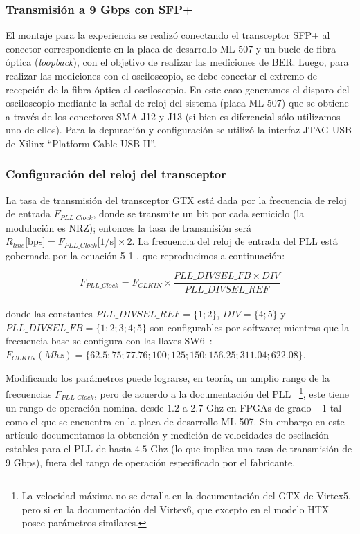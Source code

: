 \documentclass[12pt,twoside,openright]{moddalthesis}
\begin{document}
\subsubsection{Transmisión a 9 Gbps con SFP+}
El montaje para la experiencia se realizó conectando el transceptor SFP+
al conector correspondiente en la placa de desarrollo ML-507 y un bucle de
fibra óptica ({\em loopback}), con el objetivo de realizar las
mediciones de BER. Luego, para realizar las mediciones con el
osciloscopio, se debe conectar el extremo de recepción de la fibra
óptica al osciloscopio. En este caso generamos el disparo del
osciloscopio mediante la señal de reloj del sistema (placa ML-507) que
se obtiene a través de los conectores SMA J12 y J13 (si bien es
diferencial sólo utilizamos uno de ellos).  Para la depuración y
configuración se utilizó la interfaz JTAG USB de Xilinx ``Platform Cable
USB II''.
\subsubsection{Configuración del reloj del transceptor}

La tasa de transmisión del transceptor GTX está dada por la
frecuencia de reloj de entrada $F_{PLL\_Clock}$, donde se transmite un
bit por cada semiciclo (la modulación es NRZ); entonces la tasa de
transmisión será
$R_{line}\mbox{[bps]}=F_{PLL\_Clock}\mbox{[1/s]} \times 2$.  La
frecuencia del reloj de entrada del PLL está gobernada por la ecuación
5-1 \cite[Pag. 88]{ug198}, que reproducimos a continuación:

\begin{equation}
F_{PLL\_Clock} = F_{CLKIN} \times \frac{PLL\_DIVSEL\_FB \times
DIV}{PLL\_DIVSEL\_REF}%
\end{equation}\\

donde las constantes $PLL\_DIVSEL\_REF = \{1;2\}$, $DIV = \{4;5\} $ y
$PLL\_DIVSEL\_FB = \{1;2;3;4;5\}$ son configurables por software;
mientras que la frecuencia base se configura con las llaves
SW6~\cite[Tabla 1-32]{ug347}: $
F_{CLKIN} (Mhz)= \{62.5;75;77.76;100;125;150;156.25;311.04;622.08\}$.


 Modificando los parámetros puede lograrse, en teoría, un amplio rango
de la frecuencias $F_{PLL\_Clock}$, pero de acuerdo a la documentación
del PLL \cite[Pág. 71]{ug366}~\footnote{La velocidad máxima no se
detalla en la documentación del GTX de Virtex5, pero si en la
documentación del Virtex6, que excepto en el modelo HTX posee parámetros
similares.}, este tiene un rango de operación nominal desde $1.2$ a
$2.7$ Ghz en FPGAs de grado $-1$ tal como el que se encuentra en la
placa de desarrollo ML-507. Sin embargo en este artículo documentamos la
obtención y medición de velocidades de oscilación estables para el PLL
de hasta $4.5$ Ghz (lo que implica una tasa de transmisión de $9$ Gbps),
fuera del rango de operación especificado por el fabricante.
\end{document}
